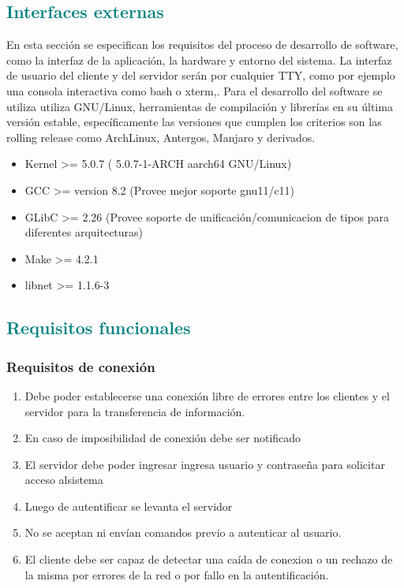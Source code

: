\documentclass[fontsize=12pt]{article}
\begin{document}
\subsection{\textcolor{teal}{\textbf{Interfaces externas}}}
En esta sección se especifican los requisitos del proceso de desarrollo de software, como la interfaz de la aplicación, la hardware y entorno del sistema.
La interfaz de usuario del cliente y del servidor serán por cualquier TTY, como por ejemplo una consola interactiva como bash o xterm,.
Para el desarrollo del software se utiliza utiliza GNU/Linux, herramientas de compilación y librerías en su última versión estable, específicamente las versiones
que cumplen los criterios son las rolling release como ArchLinux, Antergos, Manjaro y derivados.
\begin{itemize}
\item Kernel >= 5.0.7 ( 5.0.7-1-ARCH aarch64 GNU/Linux)
\item GCC >= version 8.2 (Provee mejor soporte gnu11/c11)
\item GLibC >= 2.26 (Provee soporte de unificación/comunicacion de tipos para diferentes arquitecturas)
\item Make >= 4.2.1
\item libnet >= 1.1.6-3
\end{itemize}

\subsection{\textcolor{teal}{\textbf{Requisitos funcionales}}}
\subsubsection{\textbf{Requisitos de conexión}}
\begin{enumerate}
\item Debe poder establecerse una conexión libre de errores entre los clientes y el servidor para la transferencia de información.
\item En caso de imposibilidad de conexión debe ser notificado
\item El servidor debe poder ingresar ingresa usuario y contraseña para solicitar acceso alsistema
\item Luego de autentificar se levanta el servidor
\item No se aceptan ni envían comandos previo a autenticar al usuario.
\item El cliente debe ser capaz de detectar una caída de conexion o un rechazo de la misma por errores de la red o por fallo en la autentificación.
\end{enumerate}
\end{document}
